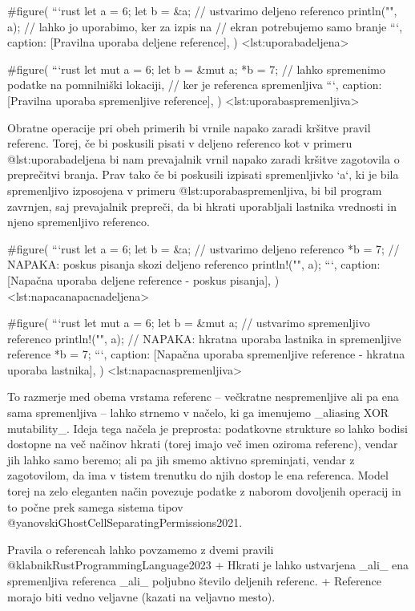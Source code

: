 \documentclass[a4paper,12pt,openright]{book}
\begin{document}
#figure(
  ```rust
  let a = 6;
  let b = &a; // ustvarimo deljeno referenco
  println("{}", a); // lahko jo uporabimo, ker za izpis na 
                    // ekran potrebujemo samo branje
  ```,
  caption: [Pravilna uporaba deljene reference],
) <lst:uporabadeljena>

#figure(
  ```rust
  let mut a = 6;
  let b = &mut a;
  *b = 7; // lahko spremenimo podatke na pomnilniški lokaciji, 
          // ker je referenca spremenljiva
  ```,
  caption: [Pravilna uporaba spremenljive reference],
) <lst:uporabaspremenljiva>

Obratne operacije pri obeh primerih bi vrnile napako zaradi kršitve pravil referenc. Torej, če bi poskusili pisati
v deljeno referenco kot v primeru @lst:uporabadeljena bi nam prevajalnik vrnil napako zaradi kršitve zagotovila o preprečitvi
branja. Prav tako če bi poskusili izpisati spremenljivko `a`, ki je bila spremenljivo izposojena v primeru @lst:uporabaspremenljiva,
bi bil program zavrnjen, saj prevajalnik prepreči, da bi hkrati uporabljali lastnika vrednosti in njeno spremenljivo referenco.

#figure(
  ```rust
  let a = 6;
  let b = &a; // ustvarimo deljeno referenco
  *b = 7; // NAPAKA: poskus pisanja skozi deljeno referenco
  println!("{}", a);
  ```,
  caption: [Napačna uporaba deljene reference - poskus pisanja],
) <lst:napacanapacnadeljena>

#figure(
  ```rust
  let mut a = 6;
  let b = &mut a; // ustvarimo spremenljivo referenco
  println!("{}", a); // NAPAKA: hkratna uporaba lastnika in spremenljive reference
  *b = 7;
  ```,
  caption: [Napačna uporaba spremenljive reference - hkratna uporaba lastnika],
) <lst:napacnaspremenljiva>

To razmerje med obema vrstama referenc -- večkratne nespremenljive ali pa ena sama spremenljiva -- lahko strnemo v načelo, ki ga imenujemo _aliasing XOR mutability_. Ideja tega načela je preprosta: podatkovne strukture so lahko bodisi dostopne na več načinov hkrati (torej imajo več imen oziroma referenc), vendar jih lahko samo beremo; ali pa jih smemo aktivno spreminjati, vendar z zagotovilom, da ima v tistem trenutku do njih dostop le ena referenca. Model torej na zelo eleganten način povezuje podatke z naborom dovoljenih operacij in to počne prek samega sistema tipov @yanovskiGhostCellSeparatingPermissions2021.

Pravila o referencah lahko povzamemo z dvemi pravili @klabnikRustProgrammingLanguage2023
+ Hkrati je lahko ustvarjena _ali_ ena spremenljiva referenca _ali_ poljubno število deljenih referenc.
+ Reference morajo biti vedno veljavne (kazati na veljavno mesto).
\end{document}
